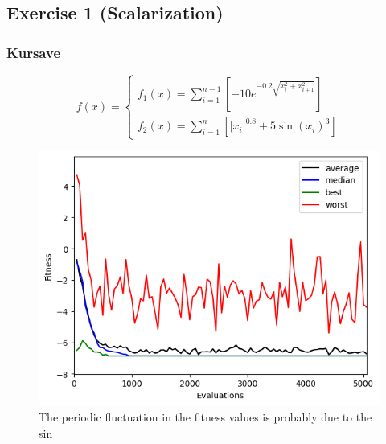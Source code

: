\subsection{Exercise 1 (Scalarization)}
\subsubsection{Kursave}

\begin{equation}
  f(x)=\begin{cases}
    f_1(x) = \sum_{i=1}^{n-1} \left[-10e^{-0.2\sqrt{x_i^2 + x_{i+1}^2}}\right] \\ 
    f_2(x) = \sum_{i=1}^n \left[|x_i|^{0.8} + 5\sin(x_i)^3\right]
  \end{cases}
\end{equation}

\begin{figure}[H]
    \centering
    \includegraphics[width=\linewidth]{images/lab4/kursave_2D_fitness.png}
    \caption{The periodic fluctuation in the fitness values is probably due to the sin}
\end{figure}

